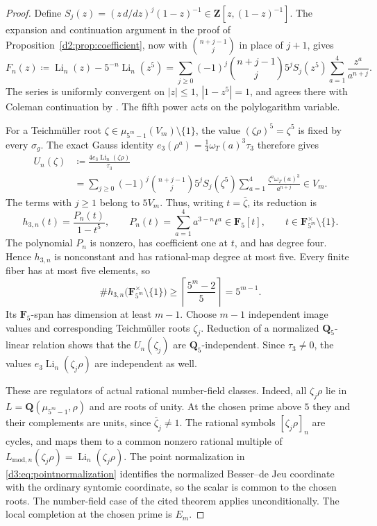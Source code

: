 \begin{proof}
Define
$S_j(z)=(z\,d/dz)^j(1-z)^{-1}\in\mathbf Z[z,(1-z)^{-1}]$.
The expansion and continuation argument in
the proof of Proposition~\ref{d2:prop:coefficient}, now with
$\binom{n+j-1}{j}$ in place of $j+1$, gives
\[
 F_n(z)\coloneqq \operatorname{Li}_n(z)-5^{-n}\operatorname{Li}_n(z^5)
 =\sum_{j\geq0}(-1)^j\binom{n+j-1}{j}5^j S_j(z^5)
             \sum_{a=1}^4\frac{z^a}{a^{n+j}}.
\]
The series is uniformly convergent on $|z|\leq1$,
$|1-z^5|=1$, and agrees there with Coleman continuation by
\cite[Theorem~2.7(3)]{BesserDeJeuAlgorithm}.
The fifth power acts on the polylogarithm variable.

For a Teichm\"uller root
$\zeta\in\mu_{5^m-1}(V_m)\setminus\{1\}$, the value
$(\zeta\rho)^5=\zeta^5$ is fixed by every $\sigma_g$.
The exact Gauss identity
$e_3(\rho^a)=\frac14\omega_T(a)^3\tau_3$ therefore gives
\begin{equation}
\label{d2ext:dimtwoVisibleHigherDepletion}
\begin{split}
 U_n(\zeta)
 &\coloneqq \frac{4e_3\operatorname{Li}_n(\zeta\rho)}{\tau_3}\\
 &=\sum_{j\geq0}(-1)^j\binom{n+j-1}{j}5^j S_j(\zeta^5)
        \sum_{a=1}^4\frac{\zeta^a\omega_T(a)^3}{a^{n+j}}
       \in V_m.
\end{split}
\end{equation}
The terms with $j\geq1$ belong to $5V_m$.  Thus, writing
$t=\overline\zeta$, its reduction is
\[
 h_{3,n}(t)
   =\frac{P_n(t)}{1-t^5},\qquad
 P_n(t)=\sum_{a=1}^4a^{3-n}t^a\in\mathbf F_5[t],
 \qquad t\in\mathbf F_{5^m}^{\times}\setminus\{1\}.
\]
The polynomial $P_n$ is nonzero, has coefficient one at $t$,
and has degree four.  Hence $h_{3,n}$ is nonconstant and has
rational-map degree at most five.  Every finite fiber has at most
five elements, so
\[
 \#h_{3,n}\bigl(\mathbf F_{5^m}^{\times}\setminus\{1\}\bigr)
 \geq\left\lceil\frac{5^m-2}{5}\right\rceil=5^{m-1}.
\]
Its $\mathbf F_5$-span has dimension at least $m-1$.
Choose $m-1$ independent image values and corresponding
Teichm\"uller roots $\zeta_j$.  Reduction of a normalized
$\mathbf Q_5$-linear relation shows that the $U_n(\zeta_j)$
are $\mathbf Q_5$-independent.  Since $\tau_3\ne0$, the values
$e_3\operatorname{Li}_n(\zeta_j\rho)$ are independent as well.

These are regulators of actual rational number-field classes.
Indeed, all $\zeta_j\rho$ lie in
$L=\mathbf Q(\mu_{5^m-1},\rho)$ and are roots of unity.
At the chosen prime above $5$ they and their complements are
units, since $\overline\zeta_j\ne1$.  The rational symbols
$[\zeta_j\rho]_n$ are cycles, and
\cite[Theorem~1.10(2)]{BesserDeJeu} maps them to a common
nonzero rational multiple of
$L_{\mathrm{mod},n}(\zeta_j\rho)
 =\operatorname{Li}_n(\zeta_j\rho)$.
The point normalization in \eqref{d3:eq:pointnormalization}
identifies the normalized Besser--de Jeu coordinate with the
ordinary syntomic coordinate, so the scalar is common to the
chosen roots. The number-field case of the cited theorem applies
unconditionally. The local completion at the chosen prime is $E_m$.


\end{proof}
